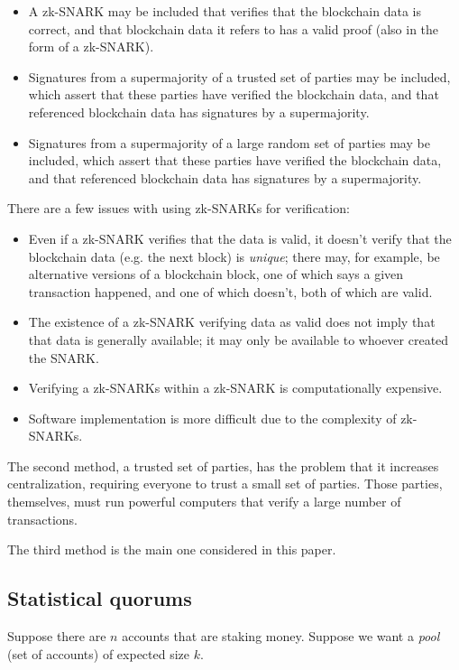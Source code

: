 \documentclass{article}
\begin{document}
\begin{itemize}
  \item A zk-SNARK may be included that verifies that the blockchain data is correct, and that blockchain data it refers to has a valid proof (also in the form of a zk-SNARK).
  \item Signatures from a supermajority of a trusted set of parties may be included, which assert that these parties have verified the blockchain data, and that referenced blockchain data has signatures by a supermajority.
  \item Signatures from a supermajority of a large random set of parties may be included, which assert that these parties have verified the blockchain data, and that referenced blockchain data has signatures by a supermajority.
\end{itemize}

There are a few issues with using zk-SNARKs for verification:

\begin{itemize}
  \item Even if a zk-SNARK verifies that the data is valid, it doesn't verify that the blockchain data (e.g. the next block) is \emph{unique}; there may, for example, be alternative versions of a blockchain
        block, one of which says a given transaction happened, and one of which doesn't, both of which are valid.
  \item The existence of a zk-SNARK verifying data as valid does not imply that that data is generally available; it may only be available to whoever created the SNARK.
  \item Verifying a zk-SNARKs within a zk-SNARK is computationally expensive.
  \item Software implementation is more difficult due to the complexity of zk-SNARKs.
\end{itemize}

The second method, a trusted set of parties, has the problem that it increases centralization, requiring everyone to trust a small set of parties.  Those parties, themselves, must run powerful computers
that verify a large number of transactions.

The third method is the main one considered in this paper.

\subsection{Statistical quorums}

Suppose there are $n$ accounts that are staking money.  Suppose we want a \textit{pool} (set of accounts) of expected size $k$.
\end{document}
